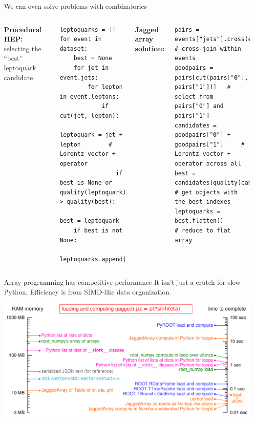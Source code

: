\documentclass[aspectratio=169]{beamer}
\begin{document}
\begin{frame}[fragile]{We can even solve problems with combinatorics}
\vspace{0.45 cm}
\begin{columns}
{\normalsize\bf Procedural HEP:} selecting the ``best'' leptoquark candidate

\scriptsize
\begin{verbatim}
leptoquarks = []
for event in dataset:
    best = None
    for jet in event.jets:
        for lepton in event.leptons:
            if cut(jet, lepton):
                leptoquark = jet + lepton        # Lorentz vector + operator
                if best is None or quality(leptoquark) > quality(best):
                    best = leptoquark
    if best is not None:
        leptoquarks.append(best)
\end{verbatim}

\vspace{0.5 cm}
{\normalsize\bf Jagged array solution:}

\scriptsize
\begin{verbatim}
pairs = events["jets"].cross(events["leptons"])  # cross-join within events
goodpairs = pairs[cut(pairs["0"], pairs["1"])]   # select from pairs["0"] and pairs["1"]
candidates = goodpairs["0"] + goodpairs["1"]     # Lorentz vector + operator across all
best = candidates[quality(candidates).argmax()]  # get objects with the best indexes
leptoquarks = best.flatten()                     # reduce to flat array
\end{verbatim}
\end{columns}
\end{frame}

\begin{frame}{Array programming has competitive performance}
\vspace{0.25 cm}
It isn't just a crutch for slow Python. Efficiency is from SIMD-like data organization.

\vspace{0.4 cm}
\includegraphics[width=\linewidth]{logscales.pdf}
\end{frame}
\end{document}
